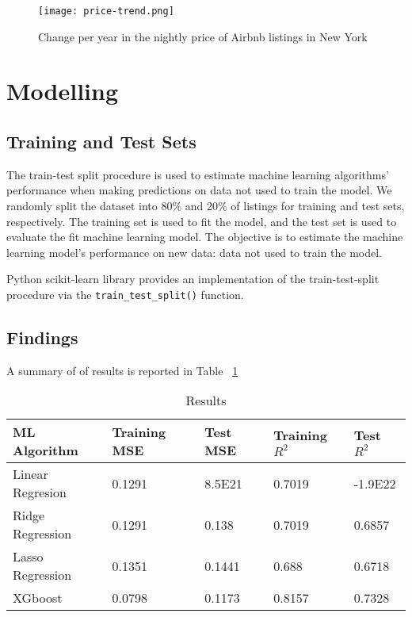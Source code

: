 \begin{figure}[!htbp] \centering
    \texttt{[image: price-trend.png]}
    \caption{Change per year in the nightly price of Airbnb listings in New York}
    \label{fig:prices-change-by-years}
\end{figure}


\section{Modelling}

\subsection{Training and Test Sets}
\label{sec:train_test_split}

The train-test split procedure is used to estimate machine learning algorithms'
performance when making predictions on data not used to train the model.  We
randomly split the dataset into 80\% and 20\% of listings for training and test
sets, respectively. The training set is used to fit the model, and the test
set is used to evaluate the fit machine learning model. The objective is to
estimate the machine learning model's performance on new data: data not used to
train the model.

Python scikit-learn library provides an implementation of the train-test-split
procedure via the \texttt{train\_test\_split()} function.

\subsection{Findings}
\label{sec:findings}

A summary of of results is reported in Table ~\ref{tab:results}

\begin{table}[!htbp]
  \centering
  \caption{Results}
  \label{tab:results}
  \begin{tabular}{lllll}
    \hline
    ML Algorithm & Training MSE & Test MSE & Training $R^2$ & Test $R^2$ \\
    \hline
    Linear Regresion & 0.1291 &  8.5E21 &  0.7019 & -1.9E22 \\
    Ridge Regression  & 0.1291 & 0.138 & 0.7019 &  0.6857 \\
    Lasso Regression & 0.1351 & 0.1441 & 0.688 & 0.6718 \\
    XGboost &  0.0798 & 0.1173 & 0.8157 &  0.7328 \\
  \end{tabular}
\end{table}


